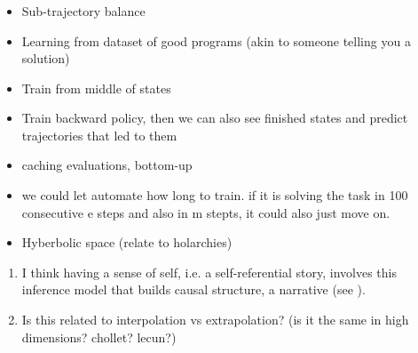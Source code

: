 \subsubsection{}
\begin{itemize}
    \item Sub-trajectory balance
    \item Learning from dataset of good programs (akin to someone telling you a solution)
    \item Train from middle of states
    \item Train backward policy, then we can also see finished states and predict trajectories that led to them
    \item caching evaluations, bottom-up
    \item we could let automate how long to train. if it is solving the task in 100 consecutive e steps and also in m stepts, it could also just move on. 
    \item Hyberbolic space (relate to holarchies)
\end{itemize}


\begin{enumerate}
    \item I think having a sense of self, i.e. a self-referential story, involves this inference model that builds causal structure, a narrative (see \cite{bouizegarene_narrative_2020}).
    \item Is this related to interpolation vs extrapolation? (is it the same in high dimensions? chollet? lecun?)
\end{enumerate}










